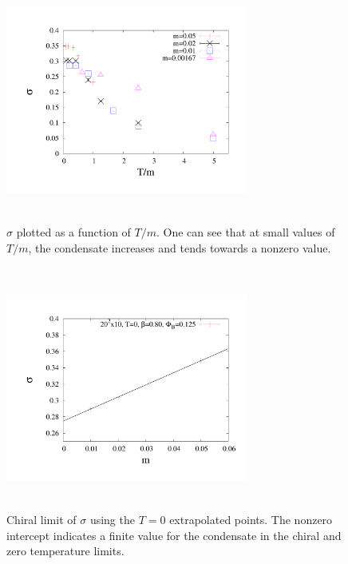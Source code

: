 \documentclass[aps,prd,twocolumn,showpacs,superscriptaddress,groupedaddress]{revtex4}  %
\begin{document}
\begin{figure}
 \includegraphics[height=8cm,width=8cm]{pbp_vs_TdivM_PHI0125_zoom_graphene_paper.pdf} \hspace{-1cm}
\caption{$\sigma$ plotted as a function of $T/m$. One can see that at small values of $T/m$, the condensate increases and tends towards a nonzero value.}
\label{PBPvsTdivM}
\end{figure}

\begin{figure}
  \includegraphics[height=8cm,width=8cm]{pbp_vs_m_zeroT_PHI0125_lin_graphene_paper.pdf} \hspace{-1cm}
\caption{Chiral limit of $\sigma$ using the $T=0$ extrapolated points. The nonzero intercept indicates a finite value for the condensate in the chiral and zero temperature limits.}
\label{PBPzeroTChiral}
\end{figure}
\end{document}
